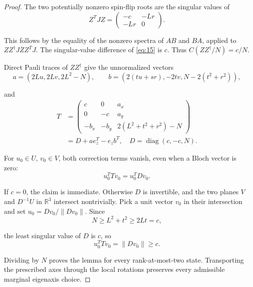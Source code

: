\documentclass[10pt,letterpaper]{article}
\begin{document}
\begin{proof}
The two potentially nonzero spin-flip roots are the singular values of
\begin{equation}
Z^TJZ=\begin{pmatrix}-c&-Lr\\-Lr&0\end{pmatrix}.
\label{eq:15}
\end{equation}

This follows by the equality of the nonzero spectra of \(AB\) and \(BA\), applied to \(ZZ^\dagger J\overline Z Z^TJ\). The singular-value difference of \eqref{eq:15} is \(c\). Thus \(C(ZZ^\dagger/N)=c/N\).

Direct Pauli traces of \(ZZ^\dagger\) give the unnormalized vectors
\begin{equation}
a=(2Lu,2Lv,2L^2-N),\qquad
b=(2(tu+sr),-2tv,N-2(t^2+r^2)),
\label{eq:16}
\end{equation}

and
\begin{equation}
\begin{aligned}
T&=\begin{pmatrix}
c&0&a_x\\0&-c&a_y\\-b_x&-b_y&2(L^2+t^2+r^2)-N
\end{pmatrix}\\
&=D+a e_z^T-e_z b^T,
\quad D=\operatorname{diag}(c,-c,N).
\end{aligned}
\label{eq:17}
\end{equation}

For \(u_0\in U\), \(v_0\in V\), both correction terms vanish, even when a Bloch vector is zero:
\begin{equation}
u_0^TTv_0=u_0^TDv_0.
\label{eq:18}
\end{equation}

If \(c=0\), the claim is immediate. Otherwise \(D\) is invertible, and the two planes \(V\) and \(D^{-1}U\) in \(\mathbb R^3\) intersect nontrivially. Pick a unit vector \(v_0\) in their intersection and set \(u_0=Dv_0/\|Dv_0\|\). Since
\begin{equation*}
N\ge L^2+t^2\ge2Lt=c,
\end{equation*}

the least singular value of \(D\) is \(c\), so
\begin{equation}
u_0^TTv_0=\|Dv_0\|\ge c.
\label{eq:19}
\end{equation}

Dividing by \(N\) proves the lemma for every rank-at-most-two state. Transporting the prescribed axes through the local rotations preserves every admissible marginal eigenaxis choice.


\end{proof}
\end{document}
